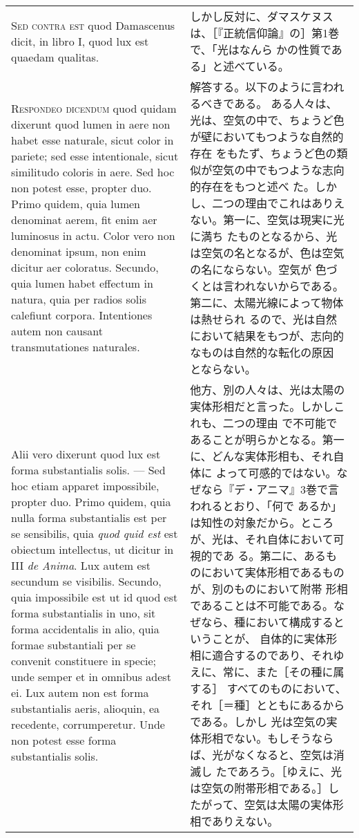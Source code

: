 \documentclass[10pt]{jsarticle} %
\begin{document}
\begin{longtable}{p{21em}p{21em}}
\\


{\scshape  Sed contra est} quod Damascenus dicit, in
libro I, quod lux est quaedam qualitas.

&

しかし反対に、ダマスケヌスは、［『正統信仰論』の］第1巻で、「光はなんら
 かの性質である」と述べている。

\\


{\scshape Respondeo dicendum} quod quidam dixerunt quod
lumen in aere non habet esse naturale, sicut color in pariete; sed esse
intentionale, sicut similitudo coloris in aere. Sed hoc non potest esse,
propter duo. Primo quidem, quia lumen denominat aerem, fit enim aer
luminosus in actu. Color vero non denominat ipsum, non enim dicitur aer
coloratus. Secundo, quia lumen habet effectum in natura, quia per radios
solis calefiunt corpora. Intentiones autem non causant transmutationes
naturales. 


&
解答する。以下のように言われるべきである。
ある人々は、光は、空気の中で、ちょうど色が壁においてもつような自然的存在
 をもたず、ちょうど色の類似が空気の中でもつような志向的存在をもつと述べ
 た。しかし、二つの理由でこれはありえない。第一に、空気は現実に光に満ち
 たものとなるから、光は空気の名となるが、色は空気の名にならない。空気が
 色づくとは言われないからである。第二に、太陽光線によって物体は熱せられ
 るので、光は自然において結果をもつが、志向的なものは自然的な転化の原因
 とならない。

\\



Alii vero dixerunt quod lux est forma substantialis solis. --- Sed hoc
etiam apparet impossibile, propter duo. Primo quidem, quia nulla forma
substantialis est per se sensibilis, quia {\itshape quod quid est} est
obiectum intellectus, ut dicitur in III {\itshape de Anima}. Lux autem
est secundum se visibilis. Secundo, quia impossibile est ut id quod est
forma substantialis in uno, sit forma accidentalis in alio, quia formae
substantiali per se convenit constituere in specie; unde semper et in
omnibus adest ei. Lux autem non est forma substantialis aeris, alioquin,
ea recedente, corrumperetur. Unde non potest esse forma substantialis
solis.


&

他方、別の人々は、光は太陽の実体形相だと言った。しかしこれも、二つの理由
 で不可能であることが明らかとなる。第一に、どんな実体形相も、それ自体に
 よって可感的ではない。なぜなら『デ・アニマ』3巻で言われるとおり、「何で
 あるか」は知性の対象だから。ところが、光は、それ自体において可視的であ
 る。第二に、あるものにおいて実体形相であるものが、別のものにおいて附帯
 形相であることは不可能である。なぜなら、種において構成するということが、
 自体的に実体形相に適合するのであり、それゆえに、常に、また［その種に属する］
 すべてのものにおいて、それ［＝種］とともにあるからである。しかし
 光は空気の実体形相でない。もしそうならば、光がなくなると、空気は消滅し
 たであろう。［ゆえに、光は空気の附帯形相である。］したがって、空気は太陽の実体形相でありえない。





\end{longtable}
\end{document}
